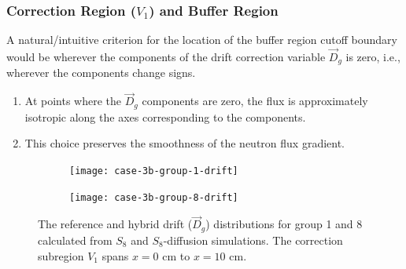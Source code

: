 \begin{frame}
  \frametitle{Correction Region ($V_1$) and Buffer Region}

  A natural/intuitive criterion for the location of the buffer region cutoff boundary
  would be wherever the components of the drift correction variable $\vec{D}_g$ is zero, i.e.,
  wherever the components change signs.
  \begin{enumerate}
    \item At points where the $\vec{D}_g$ components are zero, the flux is approximately isotropic
      along the axes corresponding to the components.
    \item This choice preserves the smoothness of the neutron flux gradient.
  \end{enumerate}
  \begin{figure}[htb!]
      \centering
      \begin{subfigure}[t]{.46\textwidth}
          \centering
          \texttt{[image: case-3b-group-1-drift]}
      \end{subfigure}
      \hfill
      \begin{subfigure}[t]{.46\textwidth}
          \centering
          \texttt{[image: case-3b-group-8-drift]}
      \end{subfigure}
      \caption{The reference and hybrid drift ($\vec{D}_g$) distributions for group 1 and 8 calculated
        from $S_8$ and $S_8$-diffusion simulations. The correction subregion $V_1$ spans $x=0$ cm to
        $x=10$ cm.}
      \label{fig:3b-drift-1}
  \end{figure}
\end{frame}


